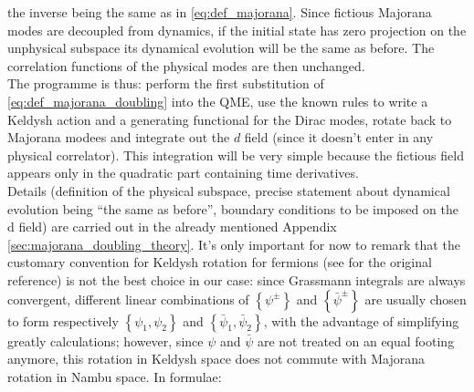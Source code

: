 \documentclass[a4paper,11pt]{article}
\theoremstyle{remark}
\newcommand{\psibar}{\bar{\psi}}
\begin{document}
  the inverse being the same as in \eqref{eq:def_majorana}. Since fictious Majorana modes are decoupled from dynamics, if the initial state has zero projection on the unphysical subspace its dynamical evolution will be the same as before. The correlation functions of the physical modes are then unchanged.\\ The programme is thus: perform the first substitution of \eqref{eq:def_majorana_doubling} into the QME, use the known rules to write a Keldysh action and a generating functional for the Dirac modes, rotate back to Majorana modees and integrate out the $d$ field (since it doesn't enter in any physical correlator). This integration will be very simple because the fictious field appears only in the quadratic part containing time derivatives.\\[0.3cm] Details (definition of the physical subspace, precise statement about dynamical evolution being ``the same as before'', boundary conditions to be imposed on the d field) are carried out in the already mentioned Appendix \eqref{sec:majorana_doubling_theory}. It's only important for now to remark that the customary convention for Keldysh rotation for fermions (see \cite{Kamenev2011} for the original reference) is not the best choice in our case: since Grassmann integrals are always convergent, different linear combinations of $\left\{\psi^{\pm}\right\}$ and $\left\{\psibar^{\pm}\right\}$ are usually chosen to form respectively $\left\{\psi_1,\psi_2\right\}$ and $\left\{\psibar_1,\psibar_2\right\}$, with the advantage of simplifying greatly calculations; however, since $\psi$ and $\psibar$ are not treated on an equal footing anymore, this rotation in Keldysh space does not commute with Majorana rotation in Nambu space. In formulae:
\end{document}
